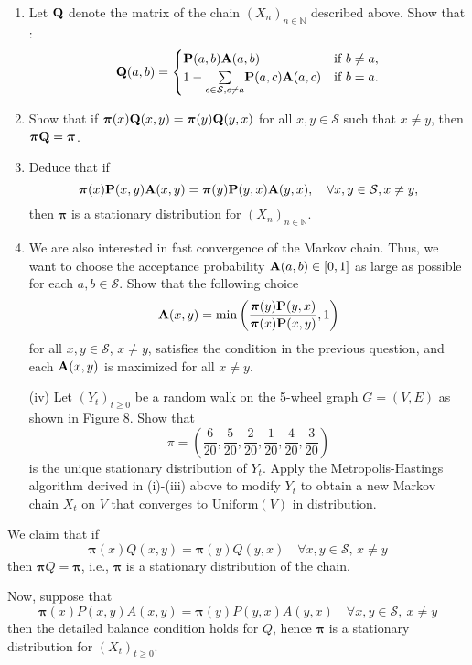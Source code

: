 \documentclass[12pt]{article}
\newcommand{\N}{\mathbb N}
\newcommand{\bP}{\bold P}
\newcommand{\calS}{\mathcal S}
\newcommand{\bQ}{\bold Q}
\newcommand{\bA}{\bold A}
\begin{document}
	\begin{enumerate}
		\item Let \( \bQ \) denote the matrix of the chain $(X_n)_{n\in\N}$ described above. Show that :
		\[
		\bQ(a, b) = 
		\begin{cases}
			\bP(a, b) \bA(a, b) & \text{if } b \neq a, \\
			1 - \underset{c\in\calS, c \neq a}{\sum} \bP(a, c) \bA(a, c) & \text{if } b = a.
		\end{cases}
		\]
		
		\item Show that if \( \bm\pi(x) \bQ(x, y) = \bm\pi(y) \bQ(y, x) \) for all \( x, y \in \calS \) such that \( x \neq y \), then  \( \bm\pi \bQ = \bm\pi \). 
		
		\item Deduce that if
		\[
		\bm\pi(x) \bP(x, y) \bA(x, y) = \bm\pi(y) \bP(y, x) \bA(y, x)
		,\quad \forall x, y \in \calS, x\neq y,
		\]
		then \( \bm\pi  \) is a stationary distribution for \( (X_n)_{n\in\N} \).
		
		\item We are also interested in fast convergence of the Markov chain. Thus, we want to choose the acceptance probability \( \bA(a, b) \in [0, 1] \) as large as possible for each \( a, b \in \calS \). Show that the following choice
		\[
		\bA(x, y) = \min \left( \frac{\bm\pi(y) \bP(y, x)}{\bm\pi(x) \bP(x, y)}, 1 \right)
		\]
		for all \( x, y \in \calS \), \( x \neq y \), satisfies the condition in the previous question, and each \( \bA(x, y) \) is maximized for all \( x \neq y \).
		
		(iv) Let \( (Y_t)_{t \geq 0} \) be a random walk on the 5-wheel graph \( G = (V, E) \) as shown in Figure 8. Show that
		\[
		\pi = \left( \frac{6}{20}, \frac{5}{20}, \frac{2}{20}, \frac{1}{20}, \frac{4}{20}, \frac{3}{20} \right)
		\]
		is the unique stationary distribution of \( Y_t \). Apply the Metropolis-Hastings algorithm derived in (i)-(iii) above to modify \( Y_t \) to obtain a new Markov chain \( X_t \) on \( V \) that converges to \( \text{Uniform}(V) \) in distribution.
		
	\end{enumerate}
	
	
	We claim that if
	\[
	\bm\pi(x) Q(x, y) = \bm\pi(y) Q(y, x) \quad \forall x, y \in \calS,\, x \neq y
	\]
	then $\bm\pi Q = \bm\pi$, i.e., $\bm\pi$ is a stationary distribution of the chain.
	
	Now, suppose that
	\[
	\bm\pi(x) P(x, y) A(x, y) = \bm\pi(y) P(y, x) A(y, x) \quad \forall x, y \in \calS,\ x \neq y
	\]
	then the detailed balance condition holds for $Q$, hence $\bm\pi$ is a stationary distribution for $(X_t)_{t \geq 0}$.
	
\end{document}
